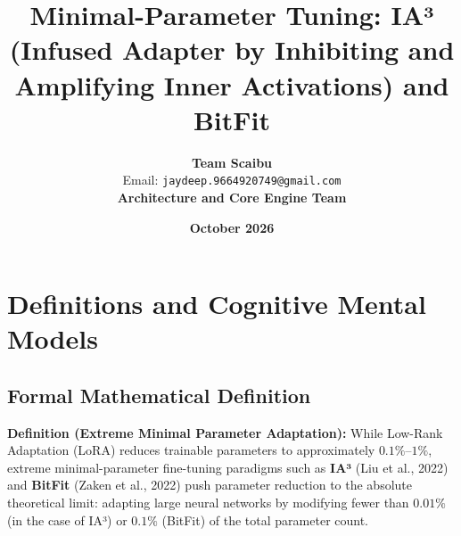 \documentclass[11pt,a4paper]{article}
\title{\textbf{Minimal-Parameter Tuning: IA³ (Infused Adapter by Inhibiting and Amplifying Inner Activations) and BitFit}}
\author{\textbf{Team Scaibu} \\ \small Email: \texttt{jaydeep.9664920749@gmail.com} \\ \small \textbf{Architecture and Core Engine Team}}
\date{\textbf{October 2026}}
\theoremstyle{definition}
\begin{document}
\maketitle

\section{Definitions and Cognitive Mental Models}

\subsection{Formal Mathematical Definition}
\textbf{Definition (Extreme Minimal Parameter Adaptation):}
While Low-Rank Adaptation (LoRA) reduces trainable parameters to approximately $0.1\%\text{--}1\%$, extreme minimal-parameter fine-tuning paradigms such as \textbf{IA³} (Liu et al., 2022) and \textbf{BitFit} (Zaken et al., 2022) push parameter reduction to the absolute theoretical limit: adapting large neural networks by modifying fewer than $0.01\%$ (in the case of IA³) or $0.1\%$ (BitFit) of the total parameter count.
\end{document}
